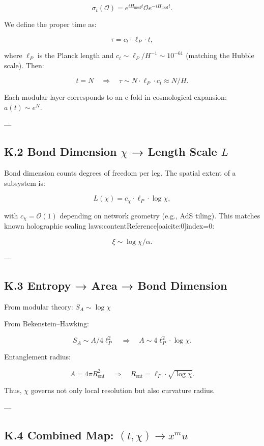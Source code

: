 \documentclass[11pt]{article}
\def\mu{mu}
\def\frac#1#2{#1/#2}
\begin{document}
\[
\sigma_t(\mathcal{O}) = e^{i H_{\text{mod}} t} \mathcal{O} e^{-i H_{\text{mod}} t}.
\]

We define the proper time as:

\[
\tau = c_t \cdot \ell_P \cdot t,
\]

where \( \ell_P \) is the Planck length and \( c_t \sim \ell_P / H^{-1} \sim 10^{-61} \) (matching the Hubble scale). Then:

\[
t = N \quad \Rightarrow \quad \tau \sim N \cdot \ell_P \cdot c_t \approx \frac{N}{H}.
\]

Each modular layer corresponds to an e-fold in cosmological expansion: \( a(t) \sim e^N \).

---

\subsection*{K.2 Bond Dimension \( \chi \) → Length Scale \( L \)}

Bond dimension counts degrees of freedom per leg. The spatial extent of a subsystem is:

\[
L(\chi) = c_\chi \cdot \ell_P \cdot \log \chi,
\]

with \( c_\chi = \mathcal{O}(1) \) depending on network geometry (e.g., AdS tiling). This matches known holographic scaling laws:contentReference[oaicite:0]{index=0}:

\[
\xi \sim \frac{\log \chi}{\alpha}.
\]

---

\subsection*{K.3 Entropy → Area → Bond Dimension}

From modular theory: \( S_A \sim \log \chi \)

From Bekenstein–Hawking:

\[
S_A \sim \frac{A}{4 \ell_P^2} \quad \Rightarrow \quad A \sim 4 \ell_P^2 \cdot \log \chi.
\]

Entanglement radius:

\[
A = 4\pi R_{\text{ent}}^2 \quad \Rightarrow \quad R_{\text{ent}} = \ell_P \cdot \sqrt{\log \chi}.
\]

Thus, \( \chi \) governs not only local resolution but also curvature radius.

---

\subsection*{K.4 Combined Map: \( (t, \chi) \rightarrow x^\mu \)}
\end{document}
